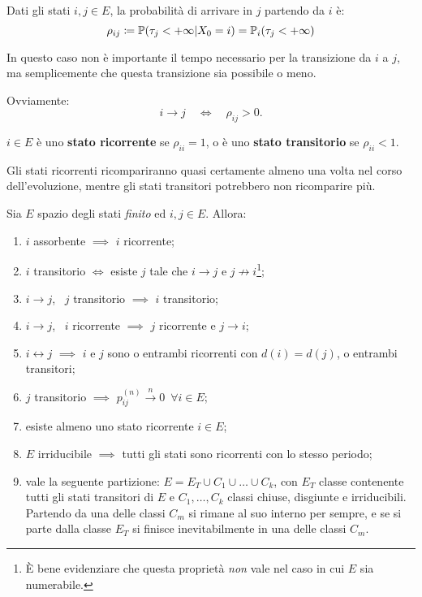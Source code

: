 \begin{defn}\label{def-di-arrivare}
	Dati gli stati $i,j \in E$, la probabilità di arrivare in $j$ partendo da $i$ è:
	$$ \rho_{ij} \coloneqq \mathbb P(\tau_j < +\infty | X_0 = i) = \mathbb P_i(\tau_j < +\infty)$$
\end{defn}
In questo caso non è importante il tempo necessario per la transizione da $i$ a $j$, ma semplicemente che questa transizione sia possibile o meno.

\begin{prop}
	Ovviamente:
	$$i \to j \quad \iff \quad \rho_{ij} > 0.$$
\end{prop}
\begin{defn}\label{def-stato-ricor-trans}
	$i \in E$ è uno \textbf{stato ricorrente} se $\rho_{ii} = 1$, o è uno \textbf{stato transitorio} se $\rho_{ii} < 1$.
\end{defn}
Gli stati ricorrenti ricompariranno quasi certamente almeno una volta nel corso dell'evoluzione, mentre gli stati transitori potrebbero non ricomparire più.

\begin{teo}\label{teo-9-reasons-why}
	Sia $E$ spazio degli stati \emph{finito} ed $i,j \in E$. Allora:
	\begin{enumerate}
		\item $i$ assorbente $\implies$ $i$ ricorrente;
		\item $i$ transitorio $\iff$ esiste $j$ tale che $i \to j$ e $j \not\to i$\footnote{È bene evidenziare che questa proprietà \emph{non} vale nel caso in cui $E$ sia numerabile.};
		\item $i \to j$, \ $j$ transitorio $\implies$ $i$ transitorio;
		\item $i \to j$, \ $i$ ricorrente $\implies$ $j$ ricorrente e $j \to i$;
		\item $i \leftrightarrow j$ $\implies$ $i$ e $j$ sono o entrambi ricorrenti con $d(i)=d(j)$, o entrambi transitori;
		\item $j$ transitorio $\implies$ $p_{ij}^{(n)} \xrightarrow{n} 0 \enspace \forall i \in E$;
		\item esiste almeno uno stato ricorrente $i \in E$;
		\item $E$ irriducibile $\implies$ tutti gli stati sono ricorrenti con lo stesso periodo;
		\item vale la seguente partizione: $E = E_T \cup C_1 \cup \dots \cup C_k$, con $E_T$ classe contenente tutti gli stati transitori di $E$ e $C_1,\dots,C_k$ classi chiuse, disgiunte e irriducibili.
		Partendo da una delle classi $C_m$ si rimane al suo interno per sempre, e se si parte dalla classe $E_T$ si finisce inevitabilmente in una delle classi $C_m$.
	\end{enumerate}
\end{teo}

